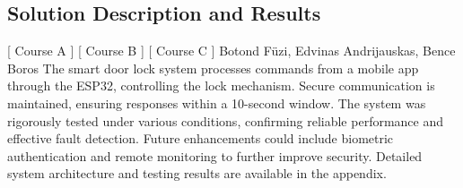\subsection{Solution Description and Results}
[ Course A ] [ Course B ] [ Course C ] 
\newline
Botond Füzi, Edvinas Andrijauskas, Bence Boros  
\newline
The smart door lock system processes commands from a mobile app through the ESP32, controlling the lock mechanism. Secure communication is maintained, ensuring responses within a 10-second window. The system was rigorously tested under various conditions, confirming reliable performance and effective fault detection. Future enhancements could include biometric authentication and remote monitoring to further improve security. Detailed system architecture and testing results are available in the appendix.